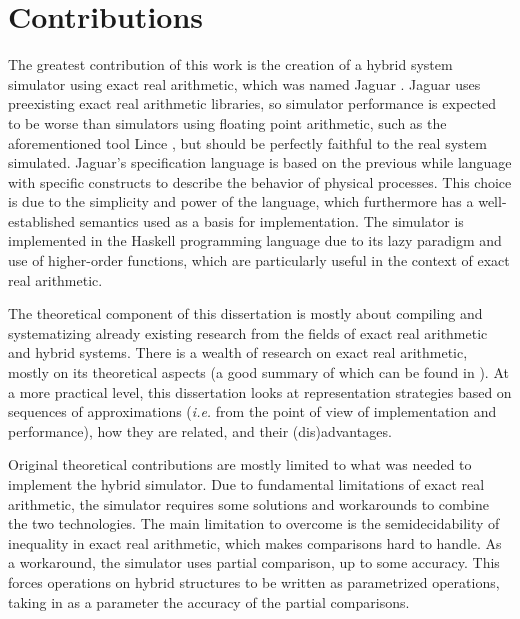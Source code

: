 \section{Contributions}

The greatest contribution of this work is the creation of a hybrid system simulator using exact real arithmetic, which was named Jaguar \cite{Jaguar}. Jaguar uses preexisting exact real arithmetic libraries, so simulator performance is expected to be worse than simulators using floating point arithmetic, such as the aforementioned tool Lince \cite{goncharov2020}, but should be perfectly faithful to the real system simulated. Jaguar's specification language is based on the previous while language with specific constructs to describe the behavior of physical processes. This choice is due to the simplicity and power of the language, which furthermore has a well-established semantics used as a basis for implementation. The simulator is implemented in the Haskell programming language \cite{Whitington2019,thompson-1996} due to its lazy paradigm and use of higher-order functions, which are particularly useful in the context of exact real arithmetic.

The theoretical component of this dissertation is mostly about compiling and systematizing already existing research from the fields of exact real arithmetic and hybrid systems. There is a wealth of research on exact real arithmetic, mostly on its theoretical aspects (a good summary of which can be found in \cite{geuvers07}). At a more practical level, this dissertation looks at representation strategies based on sequences of approximations (\textit{i.e.} from the point of view of implementation and performance), how they are related, and their (dis)advantages.

Original theoretical contributions are mostly limited to what was needed to implement the hybrid simulator. Due to fundamental limitations of exact real arithmetic, the simulator requires some solutions and workarounds to combine the two technologies. The main limitation to overcome is the semidecidability of inequality in exact real arithmetic, which makes comparisons hard to handle. As a workaround, the simulator uses partial comparison, up to some accuracy. This forces operations on hybrid structures to be written as parametrized operations, taking in as a parameter the accuracy of the partial comparisons.


